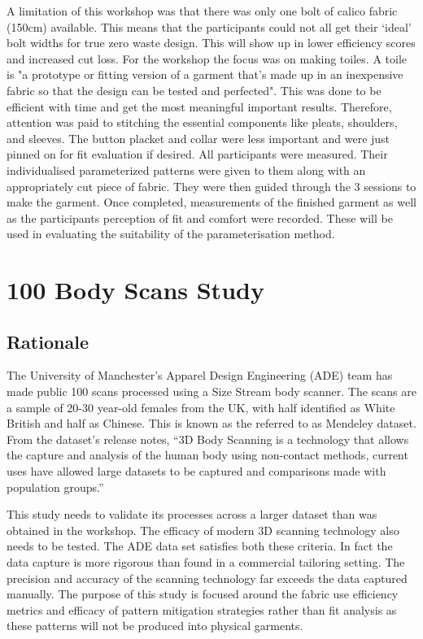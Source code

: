 A limitation of this workshop was that there was only one bolt of calico fabric (150cm) available. This means that the participants could not all get their ‘ideal’ bolt widths for true zero waste design. This will show up in lower efficiency scores and increased cut loss.
\newline
For the workshop the focus was on making toiles. A toile is "a prototype or fitting version of a garment that's made up in an inexpensive fabric so that the design can be tested and perfected". This was done to be efficient with time and get the most meaningful important results. Therefore, attention was paid to stitching the essential components like pleats, shoulders, and sleeves. The button placket and collar were less important and were just pinned on for fit evaluation if desired.
\newline
All participants were measured. Their individualised parameterized patterns were given to them along with an appropriately cut piece of fabric. They were then guided through the 3 sessions to make the garment. Once completed, measurements of the finished garment as well as the participants perception of fit and comfort were recorded. These will be used in evaluating the suitability of the parameterisation method.


\section{100 Body Scans Study}

\subsection{Rationale}
The University of Manchester’s Apparel Design Engineering (ADE) team has made public 100 scans processed using a Size Stream body scanner. The scans are a sample of 20-30 year-old females from the UK, with half identified as White British and half as Chinese. This is known as the referred to as Mendeley dataset. From the dataset’s release notes, “3D Body Scanning is a technology that allows the capture and analysis of the human body using non-contact methods, current uses have allowed large datasets to be captured and comparisons made with population groups.”

This study needs to validate its processes across a larger dataset than was obtained in the workshop. The efficacy of modern 3D scanning technology also needs to be tested. The ADE data set satisfies both these criteria. In fact the data capture is more rigorous than found in a commercial tailoring setting. The precision and accuracy of the scanning technology far exceeds the data captured manually. The purpose of this study is focused around the fabric use efficiency metrics and efficacy of pattern mitigation strategies rather than fit analysis as these patterns will not be produced into physical garments.


